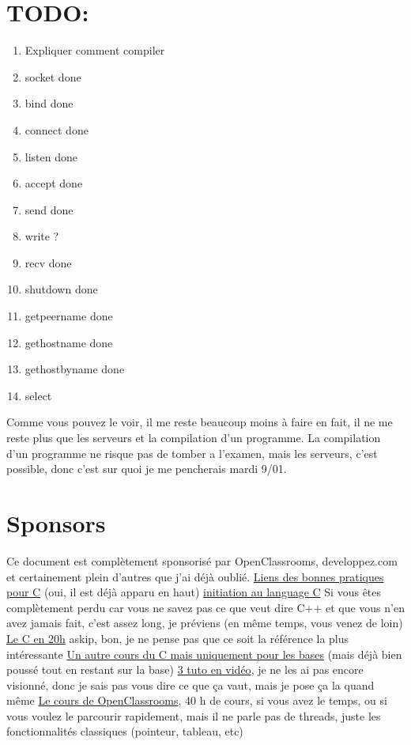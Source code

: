 \documentclass[a4paper]{article}
\begin{document}
\section{TODO:}
\begin{enumerate}
  \item Expliquer comment compiler
  \item socket done
  \item bind done
  \item connect done
  \item listen done
  \item accept done
  \item send done
  \item write ?
  \item recv done
  \item shutdown done
  \item getpeername done
  \item gethostname done
  \item gethostbyname done
  \item select
\end{enumerate}
Comme vous pouvez le voir, il me reste beaucoup moins à faire en fait, il ne me reste plus que les serveurs et la compilation d'un programme. La compilation d'un programme ne risque pas de tomber a l'examen, mais les serveurs, c'est possible, donc c'est sur quoi je me pencherais mardi 9/01.

\section{Sponsors}
Ce document est complètement sponsorisé par OpenClassrooms, developpez.com et certainement plein d'autres que j'ai déjà oublié.\newline
\href{http://emmanuel-delahaye.developpez.com/tutoriels/c/bonnes-pratiques-codage-c/#LI-A}{Liens des bonnes pratiques pour C} (oui, il est déjà apparu en haut)\newline
\href{http://melem.developpez.com/tutoriels/langage-c/initiation-langage-c/}{initiation au language C} Si vous êtes complètement perdu car vous ne savez pas ce que veut dire C++ et que vous n'en avez jamais fait, c'est assez long, je préviens (en même temps, vous venez de loin)\newline
\href{https://c.developpez.com/cours/20-heures/}{Le C en 20h} askip, bon, je ne pense pas que ce soit la référence la plus intéressante\newline
\href{https://c.developpez.com/cours/poly-c/?page=page_1}{Un autre cours du C mais uniquement pour les bases} (mais déjà bien poussé tout en restant sur la base)\newline
\href{https://fr.tuto.com/langage-c/}{3 tuto en vidéo}, je ne les ai pas encore visionné, donc je sais pas vous dire ce que ça vaut, mais je pose ça la quand même\newline
\href{https://openclassrooms.com/courses/apprenez-a-programmer-en-c}{Le cours de OpenClassrooms}, 40 h de cours, si vous avez le temps, ou si vous voulez le parcourir rapidement, mais il ne parle pas de threads, juste les fonctionnalités classiques (pointeur, tableau, etc)
\end{document}
